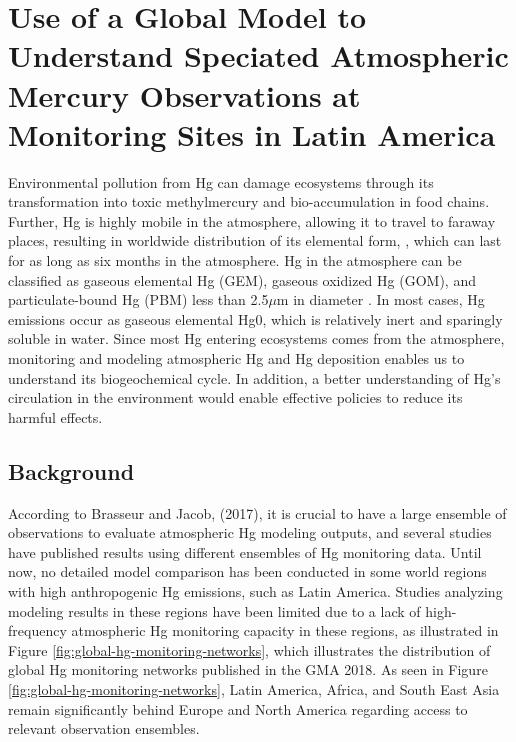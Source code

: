 \chapter{Use of a Global Model to Understand Speciated Atmospheric Mercury Observations at Monitoring Sites in Latin America }
\begin{flushleft}
Environmental pollution from Hg can damage ecosystems through its transformation into toxic methylmercury and bio-accumulation in food chains. Further, Hg is highly mobile in the atmosphere, allowing it to travel to faraway places, resulting in worldwide distribution of its elemental form, \hg, which can last for as long as six months in the atmosphere\cite{horowitz_new_2017,shah_improved_2021}. Hg in the atmosphere can be classified as gaseous elemental Hg (GEM), gaseous oxidized Hg (GOM), and particulate-bound Hg (PBM) less than 2.5$\mu$m in diameter \cite{lindberg_synthesis_2007,schroeder_atmospheric_1998,landis_development_2002}. In most cases, Hg emissions occur as gaseous elemental Hg0, which is relatively inert and sparingly soluble in water\cite{horowitz_new_2017}. Since most Hg entering ecosystems comes from the atmosphere, monitoring and modeling atmospheric Hg and Hg deposition enables us to understand its biogeochemical cycle. In addition, a better understanding of Hg's circulation in the environment would enable effective policies to reduce its harmful effects.
\end{flushleft}
\section{Background}
\begin{flushleft}

According to Brasseur and Jacob, (2017), it is crucial to have a large ensemble of observations to evaluate atmospheric Hg modeling outputs, and several studies have published results using different ensembles of Hg monitoring data. Until now, no detailed model comparison has been conducted in some world regions with high anthropogenic Hg emissions, such as Latin America. Studies analyzing modeling results in these regions have been limited due to a lack of high-frequency atmospheric Hg monitoring capacity in these regions, as illustrated in Figure \ref{fig:global-hg-monitoring-networks}, which illustrates the distribution of global Hg monitoring networks published in the GMA 2018. As seen in Figure \ref{fig:global-hg-monitoring-networks}, Latin America, Africa, and South East Asia remain significantly behind Europe and North America regarding access to relevant observation ensembles. 
\end{flushleft}


